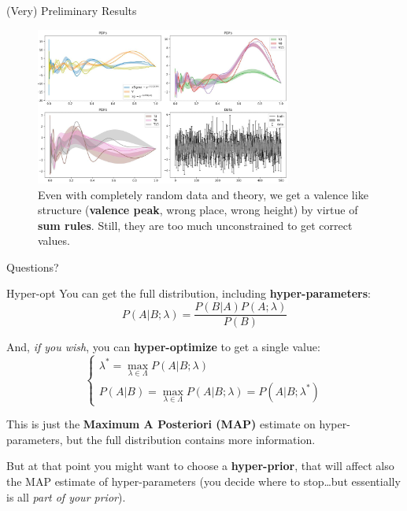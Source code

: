 \documentclass[9pt]{beamer}
\begin{document}
\begin{frame}{(Very) Preliminary Results}
    \vspace*{10pt}
    \begin{figure}
        \centering
        \includegraphics[width=0.75\textwidth]{fit-pdf}
        \caption{
            Even with completely random data and theory, we get a valence like
            structure (\textbf{valence peak}, wrong place, wrong height) by
            virtue of \textbf{sum rules}. Still, they are too much
            unconstrained to get correct values.
        }
    \end{figure}
\end{frame}

\begin{frame}[standout]
    Questions?
\end{frame}

\appendix

\begin{frame}{Hyper-opt}
    You can get the full distribution, including \textbf{hyper-parameters}:
    \begin{equation*}
        P(A|B;\lambda) = \frac{P(B|A) P(A;\lambda)}{P(B)}
    \end{equation*}

    And, \textit{if you wish}, you can \alert{\textbf{hyper-optimize}} to get a
    single value:
    \begin{equation*}
        \begin{cases}
            \lambda^* = \max_{\lambda \in \Lambda} P(A|B;\lambda)\\
            P(A|B) = \max_{\lambda \in \Lambda} P(A|B;\lambda) = P(A|B; \lambda^*)
        \end{cases}
    \end{equation*}
    
    This is just the \textbf{Maximum A Posteriori (MAP)} estimate on
    hyper-parameters, but the full distribution contains more information.

    But at that point you might want to choose a \textbf{hyper-prior}, that
    will affect also the MAP estimate of hyper-parameters (you decide where to
    stop\dots but essentially is all \textit{part of your prior}).
\end{frame}
\end{document}
